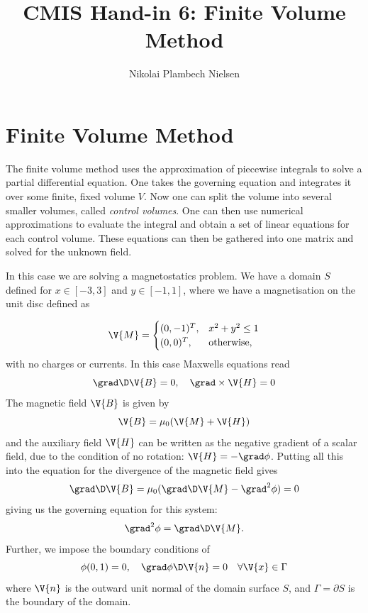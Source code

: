 \documentclass[sigconf]{acmart}
\begin{document}
%
\title{CMIS Hand-in 6: Finite Volume Method}

\author{Nikolai Plambech Nielsen}


\maketitle

\section{Finite Volume Method}
The finite volume method uses the approximation of piecewise integrals to solve a partial differential equation. One takes the governing equation and integrates it over some finite, fixed volume $ V $. Now one can split the volume into several smaller volumes, called \textit{control volumes}. One can then use numerical approximations to evaluate the integral and obtain a set of linear equations for each control volume. These equations can then be gathered into one matrix and solved for the unknown field.

In this case we are solving a magnetostatics problem. We have a domain $ S $ defined for $ x \in [-3, 3] $ and $ y \in [-1, 1] $, where we have a magnetisation on the unit disc defined as

\begin{equation}\label{key}
	\V{M} = \begin{cases}
	(0, -1)^T, &  x^2+y^2 \leq 1 \\
	(0,0)^T, & \text{otherwise},
	\end{cases}
\end{equation}
with no charges or currents. In this case Maxwells equations read
\begin{equation}\label{key}
	\grad \D \V{B} = 0, \quad \grad \times \V{H} = 0
\end{equation}
The magnetic field $ \V{B} $ is given by
\begin{equation}\label{key}
	\V{B} = \mu_0 ( \V{M} + \V{H})
\end{equation}
and the auxiliary field $ \V{H} $ can be written as the negative gradient of a scalar field, due to the condition of no rotation: $ \V{H} = -\grad \phi $. Putting all this into the equation for the divergence of the magnetic field gives
\begin{equation}\label{key}
	\grad \D \V{B} = \mu_0(\grad \D \V{M} - \grad^2 \phi) = 0
\end{equation}
giving us the governing equation for this system:
\begin{equation}\label{key}
	\grad^2 \phi = \grad \D \V{M}.
\end{equation}
Further, we impose the boundary conditions of
\begin{equation}\label{key}
	\phi(0,1) = 0, \quad \grad\phi\D \V{n} = 0 \quad \forall \V{x} \in \Gamma
\end{equation}
where $ \V{n} $ is the outward unit normal of the domain surface $ S $, and $ \Gamma = \partial S$ is the boundary of the domain.
\end{document}

